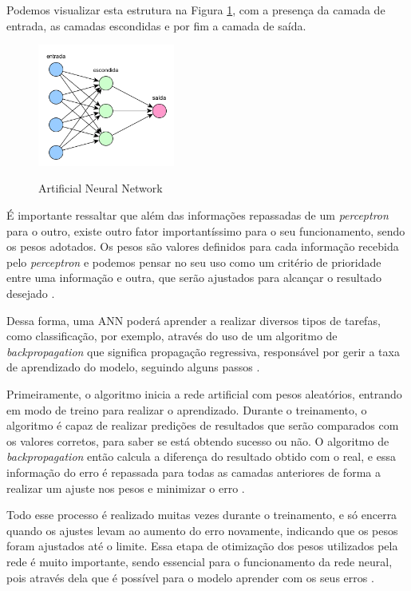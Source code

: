 Podemos visualizar esta estrutura na Figura \ref{fig:neuralNetwork}, com a presença da camada de entrada, as camadas escondidas e por fim a camada de saída.

\begin{figure}[!htb]
	\centering
	\caption{Artificial Neural Network}
	\includegraphics[width=0.40\textwidth]{img/neuralNetwork.png}
	\label{fig:neuralNetwork}
\end{figure}

É importante ressaltar que além das informações repassadas de um \emph{perceptron} para o outro, existe outro fator importantíssimo para o seu funcionamento, sendo os pesos adotados. Os pesos são valores definidos para cada informação recebida pelo \emph{perceptron} e podemos pensar no seu uso como um critério de prioridade entre uma informação e outra, que serão ajustados para alcançar o resultado desejado \cite{deepLearningTensorFlow}.

Dessa forma, uma ANN poderá aprender a realizar diversos tipos de tarefas, como classificação, por exemplo, através do uso de um algoritmo de \emph{backpropagation} que significa propagação regressiva, responsável por gerir a taxa de aprendizado do modelo, seguindo alguns passos \cite{deepLearningTensorFlow}.

Primeiramente, o algoritmo inicia a rede artificial com pesos aleatórios, entrando em modo de treino para realizar o aprendizado. Durante o treinamento, o algoritmo é capaz de realizar predições de resultados que serão comparados com os valores corretos, para saber se está obtendo sucesso ou não. O algoritmo de \emph{backpropagation} então calcula a diferença do resultado obtido com o real, e essa informação do erro é repassada para todas as camadas anteriores de forma a realizar um ajuste nos pesos e minimizar o erro \cite{deepLearningTensorFlow}.

Todo esse processo é realizado muitas vezes durante o treinamento, e só encerra quando os ajustes levam ao aumento do erro novamente, indicando que os pesos foram ajustados até o limite. Essa etapa de otimização dos pesos utilizados pela rede é muito importante, sendo essencial para o funcionamento da rede neural, pois através dela que é possível para o modelo aprender com os seus erros \cite{deepLearningTensorFlow}.

